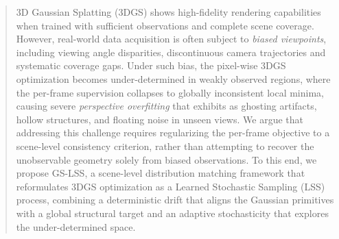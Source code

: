 \documentclass[lettersize,journal]{IEEEtran}
\begin{document}
\begin{abstract}
3D Gaussian Splatting (3DGS) shows high-fidelity rendering capabilities when trained with sufficient observations and complete scene coverage. 
However, real-world data acquisition is often subject to \textit{biased viewpoints}, including viewing angle disparities, discontinuous camera trajectories and systematic coverage gaps. 
{\color{blue} Under such bias, the pixel-wise 3DGS optimization becomes under-determined in weakly observed regions, where the per-frame supervision collapses to globally inconsistent local minima, causing severe \emph{perspective overfitting} that exhibits as ghosting artifacts, hollow structures, and floating noise in unseen views.}
{\color{blue} We argue that addressing this challenge requires regularizing the per-frame objective to a scene-level consistency criterion, rather than attempting to recover the unobservable geometry solely from biased observations.}
{\color{blue} To this end, we propose GS-LSS, a scene-level distribution matching framework that reformulates 3DGS optimization as a Learned Stochastic Sampling (LSS) process, combining a deterministic drift that aligns the Gaussian primitives with a global structural target and an adaptive stochasticity that explores the under-determined space.
}
\end{abstract}
\end{document}
